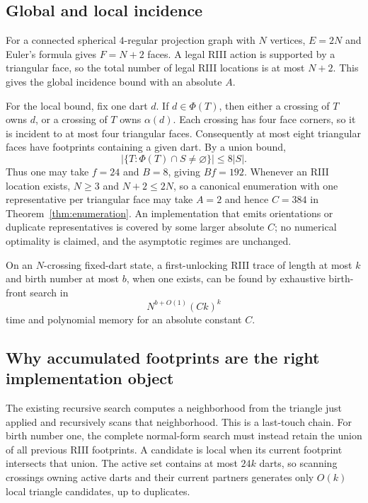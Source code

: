 \subsection{Global and local incidence}

For a connected spherical $4$-regular projection graph with $N$ vertices,
$E=2N$ and Euler's formula gives $F=N+2$ faces.  A legal RIII action is supported
by a triangular face, so the total number of legal RIII locations is at most
$N+2$.  This gives the global incidence bound with an absolute $A$.

For the local bound, fix one dart $d$.  If $d\in\Phi(T)$, then either a crossing
of $T$ owns $d$, or a crossing of $T$ owns $\alpha(d)$.  Each crossing has four
face corners, so it is incident to at most four triangular faces.  Consequently
at most eight triangular faces have footprints containing a given dart.  By a
union bound,
\[
  |\{T:\Phi(T)\cap S\neq\varnothing\}|\leq 8|S|.
\]
Thus one may take $f=24$ and $B=8$, giving $Bf=192$.  Whenever an RIII
location exists, $N\geq3$ and $N+2\leq2N$, so a canonical enumeration with one
representative per triangular face may take $A=2$ and hence $C=384$ in
Theorem~\ref{thm:enumeration}.  An implementation that emits orientations or
duplicate representatives is covered by some larger absolute $C$; no numerical
optimality is claimed, and the asymptotic regimes are unchanged.

\begin{corollary}
\label{cor:r3-bound}
On an $N$-crossing fixed-dart state, a first-unlocking RIII trace of length at most $k$ and birth number at most
$b$, when one exists, can be found by exhaustive birth-front search in
\[
  N^{b+O(1)}(Ck)^k
\]
time and polynomial memory for an absolute constant $C$.
\end{corollary}

\subsection{Why accumulated footprints are the right implementation object}

The existing recursive search computes a neighborhood from the triangle just
applied and recursively scans that neighborhood.  This is a last-touch chain.
For birth number one, the complete normal-form search must instead retain the
union of all previous RIII footprints.  A candidate is local when its current
footprint intersects that union.  The active set contains at most $24k$ darts,
so scanning crossings owning active darts and their current partners generates
only $O(k)$ local triangle candidates, up to duplicates.

